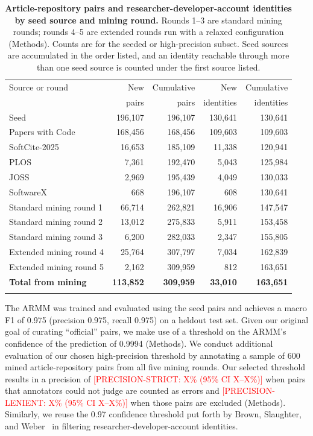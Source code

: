 \documentclass[pdflatex,sn-nature]{sn-jnl}%
\begin{document}
\begin{table}[ht]
\caption{\textbf{Article-repository pairs and researcher-developer-account identities by seed source and mining round.} Rounds 1--3 are standard mining rounds; rounds 4--5 are extended rounds run with a relaxed configuration (Methods). Counts are for the seeded or high-precision subset. Seed sources are accumulated in the order listed, and an identity reachable through more than one seed source is counted under the first source listed.}\label{tab:mining}
\begin{tabular}{@{}lrrrr@{}}
\toprule
Source or round & New & Cumulative & New & Cumulative \\
 & pairs & pairs & identities & identities \\
\midrule
Seed & 196,107 & 196,107 & 130,641 & 130,641 \\
\quad Papers with Code & 168,456 & 168,456 & 109,603 & 109,603 \\
\quad SoftCite-2025 & 16,653 & 185,109 & 11,338 & 120,941 \\
\quad PLOS & 7,361 & 192,470 & 5,043 & 125,984 \\
\quad JOSS & 2,969 & 195,439 & 4,049 & 130,033 \\
\quad SoftwareX & 668 & 196,107 & 608 & 130,641 \\
Standard mining round 1 & 66,714 & 262,821 & 16,906 & 147,547 \\
Standard mining round 2 & 13,012 & 275,833 & 5,911 & 153,458 \\
Standard mining round 3 & 6,200 & 282,033 & 2,347 & 155,805 \\
Extended mining round 4 & 25,764 & 307,797 & 7,034 & 162,839 \\
Extended mining round 5 & 2,162 & 309,959 & 812 & 163,651 \\
\midrule
\textbf{Total from mining} & \textbf{113,852} & \textbf{309,959} & \textbf{33,010} & \textbf{163,651} \\
\botrule
\end{tabular}
\end{table}

The ARMM was trained and evaluated using the seed pairs and achieves a macro F1 of 0.975 (precision 0.975, recall 0.975) on a heldout test set. Given our original goal of curating ``official'' pairs, we make use of a threshold on the ARMM's confidence of the prediction of 0.9994 (Methods). We conduct additional evaluation of our chosen high-precision threshold by annotating a sample of 600 mined article-repository pairs from all five mining rounds. Our selected threshold results in a precision of \textcolor{red}{[PRECISION-STRICT: X\% (95\% CI X--X\%)]} when pairs that annotators could not judge are counted as errors and \textcolor{red}{[PRECISION-LENIENT: X\% (95\% CI X--X\%)]} when those pairs are excluded (Methods). Similarly, we reuse the 0.97 confidence threshold put forth by Brown, Slaughter, and Weber~\cite{brown2026code} in filtering researcher-developer-account identities.
\end{document}
